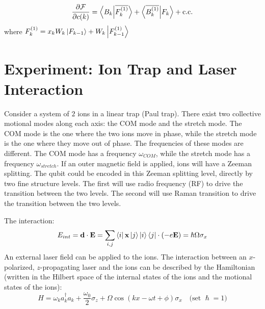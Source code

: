 \documentclass{notes2}
\newcommand{\dvbar}[1]{\overline{#1}}
\begin{document}
\begin{align*}
    \pdv{\mathcal{F}}{c(k)} = \braket{B_k}{\dvbar{F_k^{(1)}}} + \braket{\dvbar{B_k^{(1)}}}{F_k} + \text{c.c.}
\end{align*}
where $F_k^{(1)} = x_k W_k\ket{F_{k-1}} + W_k\ket{F_{k-1}^{(1)}}$
\section{Experiment: Ion Trap and Laser Interaction}
Consider a system of $2$ ions in a linear trap (Paul trap). There exist two collective motional modes along each axis: the COM mode and the stretch mode. The COM mode is the one where the two ions move in phase, while the stretch mode is the one where they move out of phase. The frequencies of these modes are different. The COM mode has a frequency $\omega_{COM}$, while the stretch mode has a frequency $\omega_{stretch}$. 
If an outer magnetic field is applied, ions will have a Zeeman splitting. The qubit could be encoded in this Zeeman splitting level, directly by two fine structure levels. The first will use radio frequency (RF) to drive the transition between the two levels. The second will use Raman transition to drive the transition between the two levels.

The interaction:
\begin{equation}
    E_{int} = \vb d \cdot \vb E = \sum_{i,j} \bra{i} \vb x \ket{j} \ket{i}\bra{j} \cdot (-e\vb E) = \hslash\Omega\sigma_x 
\end{equation}
An external laser field can be applied to the ions. The interaction between an $x$-polarized, $z$-propagating laser and the ions can be described by the Hamiltonian (written in the Hilbert space of the internal states of the ions and the motional states of the ions):
\begin{equation}
H =  \omega_k a_k^\dagger a_k +  \frac{\omega_0}{2} \sigma_z +  {\Omega} \cos(k x - \omega t + \phi)\sigma_x \quad \text{(set $\hslash = 1$)}
\end{equation}
\end{document}
